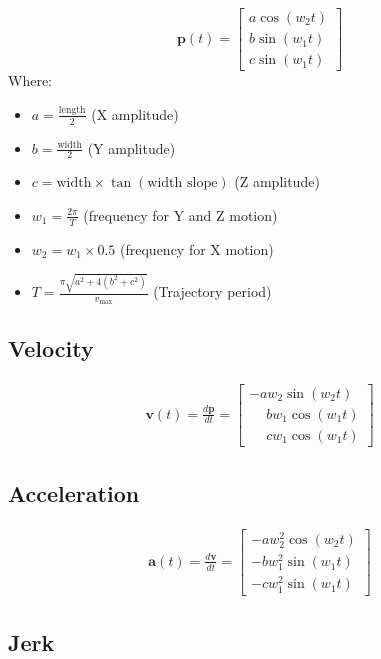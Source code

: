 \documentclass{article}
\begin{document}
	\[
	\mathbf{p}(t) =
	\begin{bmatrix}
		a \cos(w_2 t) \\
		b \sin(w_1 t) \\
		c \sin(w_1 t)
	\end{bmatrix}
	\]
	Where:
	\begin{itemize}
		\item $a = \frac{\text{length}}{2}$ (X amplitude)
		\item $b = \frac{\text{width}}{2}$ (Y amplitude)
		\item $c = \text{width} \times \tan(\text{width slope})$ (Z amplitude)
		\item $w_1 = \frac{2\pi}{T}$ (frequency for Y and Z motion)
		\item $w_2 = w_1 \times 0.5$ (frequency for X motion)
		\item $T = \frac{\pi \sqrt{a^2 + 4(b^2 + c^2)}}{v_{\text{max}}}$ (Trajectory period)
	\end{itemize}
\subsection*{Velocity}

\begin{align*}
	\mathbf{v}(t) = \frac{d\mathbf{p}}{dt} =
	\begin{bmatrix}
		- a w_2 \sin(w_2 t) \\
		\phantom{-} b w_1 \cos(w_1 t) \\
		\phantom{-} c w_1 \cos(w_1 t)
	\end{bmatrix}
\end{align*}

\subsection*{Acceleration}

\begin{align*}
	\mathbf{a}(t) = \frac{d\mathbf{v}}{dt} =
	\begin{bmatrix}
		- a w_2^2 \cos(w_2 t) \\
		- b w_1^2 \sin(w_1 t) \\
		- c w_1^2 \sin(w_1 t)
	\end{bmatrix}
\end{align*}

\subsection*{Jerk}
\end{document}
